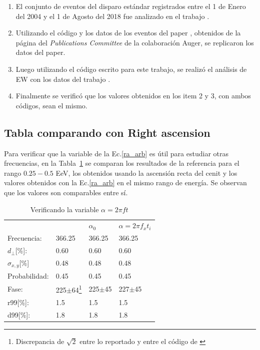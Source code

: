 \begin{enumerate}[noitemsep]
    \item El conjunto de eventos del disparo estándar registrados entre el 1 de Enero del 2004 y el 1 de Agosto del 2018 fue analizado en el trabajo \cite{Aab_2020}.
    \item Utilizando el código y los datos de los eventos del paper \cite{Aab_2020}, obtenidos de la página del \emph{Publications Committee} de la colaboración Auger, se replicaron los datos del paper. 
    \item Luego utilizando el código escrito para este trabajo, se realizó el análisis de EW con los datos del trabajo \cite{Aab_2020}. 
    \item Finalmente se verificó que los valores obtenidos en los item 2 y 3, con  ambos códigos, sean el mismo.
\end{enumerate}

\subsection*{Tabla comparando con Right ascension}

Para verificar que la variable de la Ec.\ref{ra_arb} es útil para estudiar otras frecuencias, en la Tabla~\ref{tab:comp_vars} se comparan los resultados de la referencia para el rango $0.25-0.5$ EeV, los obtenidos usando la ascensión recta del cenit y los valores obtenidos con la Ec.\ref{ra_arb} en el mismo rango de energía. Se observan que los valores son comparables entre sí.
\begin{table}[H]
    \begin{small}
        \begin{center}
            \begin{tabular}[c]{l|l|l|l}
                                & \cite{Aab_2020} & $\alpha_0$   & $\alpha=2\pi f_xt_i$   \\ 
                Frecuencia:     & 366.25          &  366.25      &  366.25            \\
                $d_\perp$[\%]:  & 0.60            &  0.60        &  0.60              \\
                $\sigma_{x,y}$[\%]&0.48           &  0.48        &  0.48              \\ 
                Probabilidad:   & 0.45            &  0.45        &  0.45              \\
                Fase:           & 225$\pm$64\footnote{Discrepancia de $\sqrt{2}$ entre lo reportado y entre el código de \cite{Aab_2020}} 
                                &  225$\pm$45   &  227$\pm$45          \\
                r99[\%]:            & 1.5           &  1.5       &  1.5             \\
                d99[\%]:            & 1.8           &  1.8       &  1.8             \\
            \end{tabular}
        \end{center}
        \caption{Verificando la  variable $\alpha=2\pi ft$}
        \label{tab:comp_vars}
    \end{small}
\end{table}

